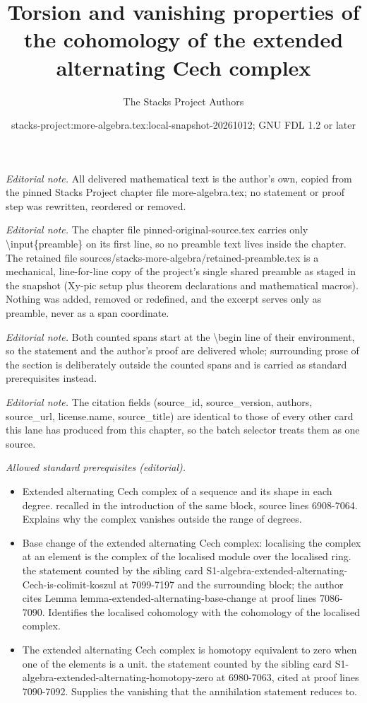 \documentclass[10pt,a4paper]{amsart}
\title{Torsion and vanishing properties of the cohomology of the extended alternating Cech complex}
\author{The Stacks Project Authors}
\date{stacks-project:more-algebra.tex:local-snapshot-20261012; GNU FDL 1.2 or later}
\theoremstyle{plain}
\theoremstyle{definition}
\theoremstyle{remark}
\numberwithin{equation}{subsection}
\begin{document}
\maketitle
\setcounter{subsection}{1}
\noindent\textit{Editorial note.} All delivered mathematical text is the author's own, copied from the pinned Stacks Project chapter file more-algebra.tex; no statement or proof step was rewritten, reordered or removed.\par\medskip
\noindent\textit{Editorial note.} The chapter file pinned-original-source.tex carries only \textbackslash{}input\{preamble\} on its first line, so no preamble text lives inside the chapter. The retained file sources/stacks-more-algebra/retained-preamble.tex is a mechanical, line-for-line copy of the project's single shared preamble as staged in the snapshot (Xy-pic setup plus theorem declarations and mathematical macros). Nothing was added, removed or redefined, and the excerpt serves only as preamble, never as a span coordinate.\par\medskip
\noindent\textit{Editorial note.} Both counted spans start at the \textbackslash{}begin line of their environment, so the statement and the author's proof are delivered whole; surrounding prose of the section is deliberately outside the counted spans and is carried as standard prerequisites instead.\par\medskip
\noindent\textit{Editorial note.} The citation fields (source\_id, source\_version, authors, source\_url, license.name, source\_title) are identical to those of every other card this lane has produced from this chapter, so the batch selector treats them as one source.\par\medskip
\noindent\textit{Allowed standard prerequisites (editorial).}\begin{itemize}
\item Extended alternating Cech complex of a sequence and its shape in each degree. recalled in the introduction of the same block, source lines 6908-7064. Explains why the complex vanishes outside the range of degrees.
\item Base change of the extended alternating Cech complex: localising the complex at an element is the complex of the localised module over the localised ring. the statement counted by the sibling card S1-algebra-extended-alternating-Cech-is-colimit-koszul at 7099-7197 and the surrounding block; the author cites Lemma lemma-extended-alternating-base-change at proof lines 7086-7090. Identifies the localised cohomology with the cohomology of the localised complex.
\item The extended alternating Cech complex is homotopy equivalent to zero when one of the elements is a unit. the statement counted by the sibling card S1-algebra-extended-alternating-homotopy-zero at 6980-7063, cited at proof lines 7090-7092. Supplies the vanishing that the annihilation statement reduces to.
\end{itemize}\medskip
\end{document}
